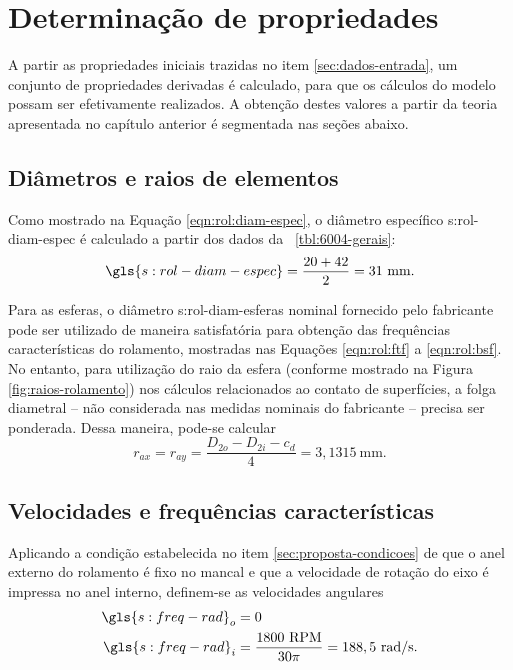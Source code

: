 \documentclass[12pt,oneside,english,brazil,lmodern,siglas,simbolos,cite=num]{ucsmonograph}
\begin{document}
	\begin{figure}[t]
		\label{fig:3d-rolamento}
	\end{figure}

	\section{Determinação de propriedades}
	A partir as propriedades iniciais trazidas no item \ref{sec:dados-entrada}, um conjunto de propriedades derivadas é calculado, para que os cálculos do modelo possam ser efetivamente realizados.
	A obtenção destes valores a partir da teoria apresentada no capítulo anterior é segmentada nas seções abaixo.

	\subsection{Diâmetros e raios de elementos}	
	Como mostrado na Equação \ref{eqn:rol:diam-espec}, o diâmetro específico \gls{s:rol-diam-espec} é calculado a partir dos dados da \tablename\ \ref{tbl:6004-gerais}:
	\begin{equation*}
		\gls{s:rol-diam-espec} = \frac{20 + 42}{2} = 31\ \text{mm}.
	\end{equation*}
	
	Para as esferas, o diâmetro \gls{s:rol-diam-esferas} nominal fornecido pelo fabricante pode ser utilizado de maneira satisfatória para obtenção das frequências características do rolamento, mostradas nas Equações \ref{eqn:rol:ftf} a \ref{eqn:rol:bsf}.
	No entanto, para utilização do raio da esfera (conforme mostrado na Figura \ref{fig:raios-rolamento}) nos cálculos relacionados ao contato de superfícies, a folga diametral -- não considerada nas medidas nominais do fabricante -- precisa ser ponderada.
	Dessa maneira, pode-se calcular
	\begin{equation}
		r_{ax} = r_{ay} = \frac{D_{2o} - D_{2i} - c_d}{4} = 3,1315\ \text{mm}.
	\end{equation}
	
	\subsection{Velocidades e frequências características}
	Aplicando a condição estabelecida no item \ref{sec:proposta-condicoes} de que o anel externo do rolamento é fixo no mancal e que a velocidade de rotação do eixo é impressa no anel interno, definem-se as velocidades angulares
	\setlength{}
	\begin{align}
		\gls{s:freq-rad}_o &= 0 \\
		\gls{s:freq-rad}_i &= \frac{1800\ \text{RPM}}{30\pi} = 188,5\ \text{rad/s}.
	\end{align}
	
\end{document}
